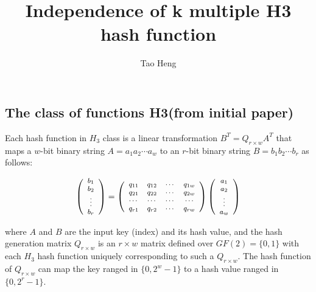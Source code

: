 \documentclass[10.5pt,onecolumn,twoside]{article}
\begin{document}
\begin{CJK*}{UTF8}{song}
\title{Independence of k multiple H3 hash function}
\author{Tao Heng}
\maketitle
\section{The class of functions H3(from initial paper)}

Each hash function in $H_3$ class is a linear transformation ${B^T} = {Q_{r \times w}}{A^T}$ that maps a $w$-bit binary string $A = {a_1}{a_2} \cdots {a_w}$ to an $r$-bit binary string $B = {b_1}{b_2} \cdots {b_r}$ as follows:

\begin{equation}
\footnotesize
\left( {\begin{array}{*{20}{c}}
   {{b_1}}  \\
   {{b_2}}  \\
    \vdots   \\
   {{b_r}}  \\
\end{array}} \right) = \left( {\begin{array}{*{20}{c}}
   {{q_{11}}} & {{q_{12}}} &  \cdots  & {{q_{1w}}}  \\
   {{q_{21}}} & {{q_{22}}} &  \cdots  & {{q_{2w}}}  \\
    \cdots  &  \cdots  &  \cdots  &  \cdots   \\
   {{q_{r1}}} & {{q_{r2}}} &  \cdots  & {{q_{rw}}}  \\
\end{array}} \right)\left( {\begin{array}{*{20}{c}}
   {{a_1}}  \\
   {{a_2}}  \\
    \vdots   \\
   {{a_w}}  \\
\end{array}} \right)
\label{eq:h3hash}
\end{equation}

\noindent where $A$ and $B$ are the input key (index) and its hash value, and the hash generation matrix ${Q_{r \times w}}$ is an $r \times w$ matrix defined over $GF(2)=\{0,1\}$ with each $H_3$ hash function uniquely corresponding to such a ${Q_{r \times w}}$. The hash function of ${Q_{r \times w}}$ can map the key ranged in $\{0,{2^w} - 1\}$ to a hash value ranged in $\{0,{2^r} - 1\}$.


\end{CJK*}
\end{document}
